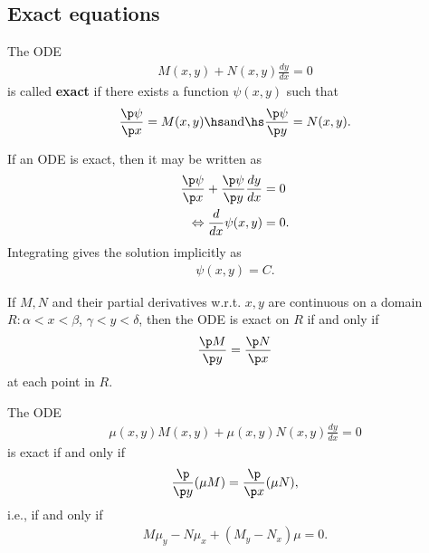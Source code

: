 \documentclass{article}
\begin{document}
\subsection{Exact equations}


\begin{definition}
	The ODE
	\begin{align*}
		M(x,y)+N(x,y)\frac{dy}{dx}=0
	\end{align*}
	is called \textbf{exact} if there exists a function $\psi(x,y)$ such that
	\begin{align*}
		\frac{\p \psi}{\p x}=M(x,y)\hs\text{and}\hs\frac{\p\psi}{\p y}=N(x,y).
	\end{align*}
\end{definition}

\begin{theorem}
	If an ODE is exact, then it may be written as
	\begin{align*}
		\frac{\p\psi}{\p x}+\frac{\p\psi}{\p y}\frac{dy}{dx} & =0  \\
		\Leftrightarrow \frac{d}{dx}\psi(x,y)                & =0.
	\end{align*}
	Integrating gives the solution implicitly as
	\begin{align*}
		\psi(x,y)=C.
	\end{align*}
\end{theorem}

\begin{theorem}
	If $M,N$ and their partial derivatives w.r.t. $x,y$ are continuous
	on a domain $R:\alpha<x<\beta$, $\gamma<y<\delta$, then the ODE is
	exact on $R$ if and only if
	\begin{align*}
		\frac{\p M}{\p y}=\frac{\p N}{\p x}
	\end{align*}
	at each point in $R$.
\end{theorem}

\begin{theorem}
	The ODE
	\begin{align*}
		\mu(x,y)M(x,y)+\mu(x,y)N(x,y)\frac{dy}{dx}=0
	\end{align*}
	is exact if and only if
	\begin{align*}
		\frac{\p}{\p y}(\mu M)=\frac{\p}{\p x}(\mu N),
	\end{align*}
	i.e., if and only if
	\begin{align*}
		M\mu_y - N\mu_x + (M_y - N_x)\mu = 0.
	\end{align*}
\end{theorem}
\end{document}
